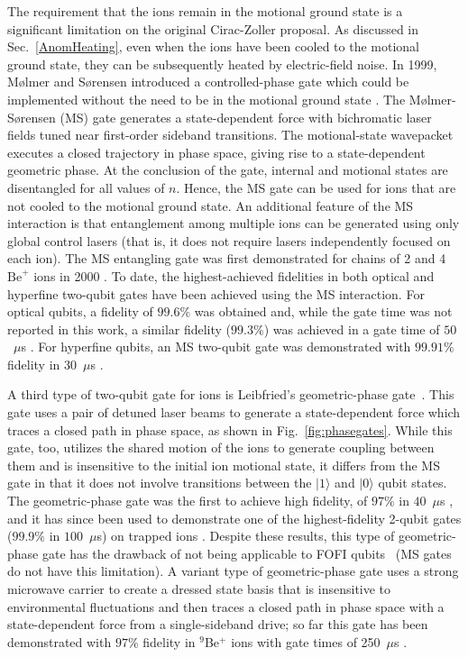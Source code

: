 \documentclass[%
reprint,
 amsmath,amssymb,
]{revtex4-1}
\newcommand{\zero}{|0 \rangle}
\newcommand{\one}{|1 \rangle}
\begin{document}
The requirement that the ions remain in the motional ground state is a significant limitation on the original Cirac-Zoller proposal. As discussed in Sec.~\ref{AnomHeating}, even when the ions have been cooled to the motional ground state, they can be subsequently heated by electric-field noise. In 1999, M{\o}lmer and S{\o}rensen introduced a controlled-phase gate which could be implemented without the need to be in the motional ground state \cite{MolmerSorensenGate}. The M{\o}lmer-S{\o}rensen (MS) gate generates a state-dependent force with bichromatic laser fields tuned near first-order sideband transitions. The motional-state wavepacket executes a closed trajectory in phase space, giving rise to a state-dependent geometric phase. At the conclusion of the gate, internal and motional states are disentangled for all values of $n$. Hence, the MS gate can be used for ions that are not cooled to the motional ground state. An additional feature of the MS interaction is that entanglement among multiple ions can be generated using only global control lasers (that is, it does not require lasers independently focused on each ion). The MS entangling gate was first demonstrated for chains of 2 and 4 $\mathrm{Be}^{+}$ ions in 2000 \cite{Sackett4IonEntanglement2000}. To date, the highest-achieved fidelities in both optical and hyperfine two-qubit gates have been achieved using the MS interaction. For optical qubits, a fidelity of $99.6 \%$ was obtained \cite{ErhardBlattCycleBench2019} and, while the gate time was not reported in this work, a similar fidelity ($99.3 \%$) was achieved in a gate time of $50$~$\mu$s \cite{BenhelmMSGate2008}.  For hyperfine qubits, an MS two-qubit gate was demonstrated with $99.91 \%$ fidelity in $30$~$\mu$s \cite{nist_gate_2016}.

A third type of two-qubit gate for ions is Leibfried's geometric-phase gate~\cite{LeibfriedDidiGate2003}. This gate uses a pair of detuned laser beams to generate a state-dependent force which traces a closed path in phase space, as shown in Fig.~\ref{fig:phasegates}. While this gate, too, utilizes the shared motion of the ions to generate coupling between them and is insensitive to the initial ion motional state, it differs from the MS gate in that it does not involve transitions between the $\one$ and $\zero$ qubit states. The geometric-phase gate was the first to achieve high fidelity, of $97 \%$ in $40$~$\mu$s \cite{LeibfriedDidiGate2003}, and it has since been used to demonstrate one of the highest-fidelity 2-qubit gates ($99.9 \%$ in $100$~$\mu$s) on trapped ions \cite{Ballance2QubitHyperfineGate2016}.  Despite these results, this type of geometric-phase gate has the drawback of not being applicable to FOFI qubits~\cite{LangerThesis2005} (MS gates do not have this limitation).  A variant type of geometric-phase gate \cite{BermudezGate2012} uses a strong microwave carrier to create a dressed state basis that is insensitive to environmental fluctuations and then traces a closed path in phase space with a state-dependent force from a single-sideband drive; so far this gate has been demonstrated with $97 \%$ fidelity in $^9$Be$^+$ ions with gate times of 250~$\mu$s \cite{TanDressedState2013}.
\end{document}
